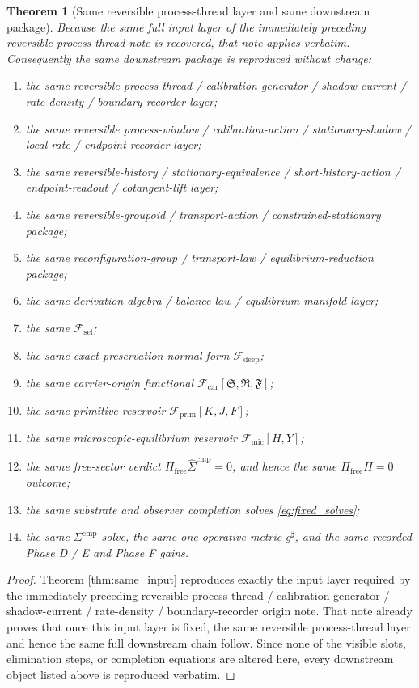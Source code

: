 \documentclass[11pt]{article}
\newcommand{\CompletedMetric}{g^{\sharp}}
\newcommand{\CompLift}{\widehat\Sigma^{\mathrm{cmp}}}
\newcommand{\FreeProj}{\Pi_{\mathrm{free}}}
\newcommand{\GaugeAux}{Y}
\newcommand{\MicFunctional}{\mathscr F_{\mathrm{mic}}}
\newcommand{\PrimFunctional}{\mathscr F_{\mathrm{prim}}}
\newcommand{\CarrierFunctional}{\mathscr F_{\mathrm{car}}}
\newcommand{\DeepFunctional}{\mathscr F_{\mathrm{deep}}}
\newcommand{\StemFunctional}{\mathscr F_{\mathrm{sel}}}
\newcommand{\PrimStrain}{K}
\newcommand{\PrimNeutral}{J}
\newcommand{\PrimFree}{F}
\newcommand{\CarrierSeed}{\mathfrak S}
\newcommand{\RelabelSeed}{\mathfrak R}
\newcommand{\FreeSeed}{\mathfrak F}
\newtheorem{theorem}{Theorem}
\begin{document}
\begin{theorem}[Same reversible process-thread layer and same downstream package]
\label{thm:same_package}
Because the same full input layer of the immediately preceding reversible-process-thread note is recovered, that note applies verbatim. Consequently the same downstream package is reproduced without change:
\begin{enumerate}
    \item the same reversible process-thread / calibration-generator / shadow-current / rate-density / boundary-recorder layer;
    \item the same reversible process-window / calibration-action / stationary-shadow / local-rate / endpoint-recorder layer;
    \item the same reversible-history / stationary-equivalence / short-history-action / endpoint-readout / cotangent-lift layer;
    \item the same reversible-groupoid / transport-action / constrained-stationary package;
    \item the same reconfiguration-group / transport-law / equilibrium-reduction package;
    \item the same derivation-algebra / balance-law / equilibrium-manifold layer;
    \item the same \(\StemFunctional\);
    \item the same exact-preservation normal form \(\DeepFunctional\);
    \item the same carrier-origin functional \(\CarrierFunctional[\CarrierSeed,\RelabelSeed,\FreeSeed]\);
    \item the same primitive reservoir \(\PrimFunctional[\PrimStrain,\PrimNeutral,\PrimFree]\);
    \item the same microscopic-equilibrium reservoir \(\MicFunctional[H,\GaugeAux]\);
    \item the same free-sector verdict \(\FreeProj\CompLift=0\), and hence the same \(\Pi_{\mathrm{free}}H=0\) outcome;
    \item the same substrate and observer completion solves \eqref{eq:fixed_solves};
    \item the same \(\Sigma^{\mathrm{cmp}}\) solve, the same one operative metric \(\CompletedMetric\), and the same recorded Phase D / E and Phase F gains.
\end{enumerate}
\end{theorem}

\begin{proof}
Theorem \ref{thm:same_input} reproduces exactly the input layer required by the immediately preceding reversible-process-thread / calibration-generator / shadow-current / rate-density / boundary-recorder origin note. That note already proves that once this input layer is fixed, the same reversible process-thread layer and hence the same full downstream chain follow. Since none of the visible slots, elimination steps, or completion equations are altered here, every downstream object listed above is reproduced verbatim.
\end{proof}
\end{document}
